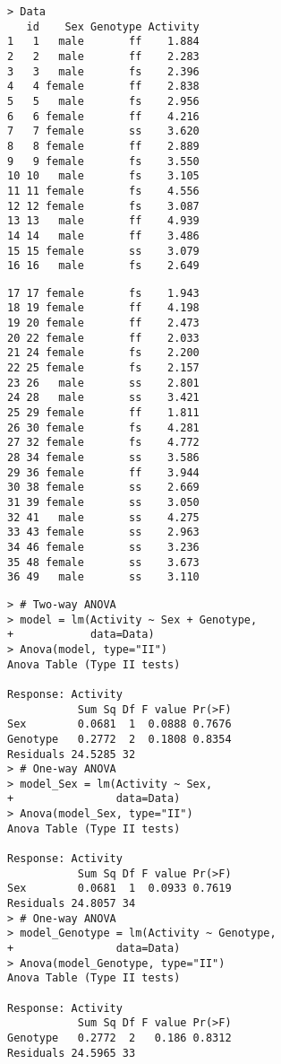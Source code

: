 \begin{frame}[fragile]
	\begin{minipage}{0.45\textwidth}
	\begin{lstlisting}
> Data
   id    Sex Genotype Activity
1   1   male       ff    1.884
2   2   male       ff    2.283
3   3   male       fs    2.396
4   4 female       ff    2.838
5   5   male       fs    2.956
6   6 female       ff    4.216
7   7 female       ss    3.620
8   8 female       ff    2.889
9   9 female       fs    3.550
10 10   male       fs    3.105
11 11 female       fs    4.556
12 12 female       fs    3.087
13 13   male       ff    4.939
14 14   male       ff    3.486
15 15 female       ss    3.079
16 16   male       fs    2.649
	\end{lstlisting}
	\end{minipage}
	\hfill
	\begin{minipage}{0.45\textwidth}
	\begin{lstlisting}
17 17 female       fs    1.943
18 19 female       ff    4.198
19 20 female       ff    2.473
20 22 female       ff    2.033
21 24 female       fs    2.200
22 25 female       fs    2.157
23 26   male       ss    2.801
24 28   male       ss    3.421
25 29 female       ff    1.811
26 30 female       fs    4.281
27 32 female       fs    4.772
28 34 female       ss    3.586
29 36 female       ff    3.944
30 38 female       ss    2.669
31 39 female       ss    3.050
32 41   male       ss    4.275
33 43 female       ss    2.963
34 46 female       ss    3.236
35 48 female       ss    3.673
36 49   male       ss    3.110
	\end{lstlisting}
	\end{minipage}
\end{frame}
\begin{frame}[fragile]
	\begin{minipage}{0.46\textwidth}
	\begin{lstlisting}
> # Two-way ANOVA
> model = lm(Activity ~ Sex + Genotype,
+            data=Data)
> Anova(model, type="II")
Anova Table (Type II tests)

Response: Activity
           Sum Sq Df F value Pr(>F)
Sex        0.0681  1  0.0888 0.7676
Genotype   0.2772  2  0.1808 0.8354
Residuals 24.5285 32
> # One-way ANOVA
> model_Sex = lm(Activity ~ Sex,
+                data=Data)
> Anova(model_Sex, type="II")
Anova Table (Type II tests)

Response: Activity
           Sum Sq Df F value Pr(>F)
Sex        0.0681  1  0.0933 0.7619
Residuals 24.8057 34
> # One-way ANOVA
> model_Genotype = lm(Activity ~ Genotype,
+                data=Data)
> Anova(model_Genotype, type="II")
Anova Table (Type II tests)

Response: Activity
           Sum Sq Df F value Pr(>F)
Genotype   0.2772  2   0.186 0.8312
Residuals 24.5965 33
	\end{lstlisting}
	\end{minipage}
\end{frame}
